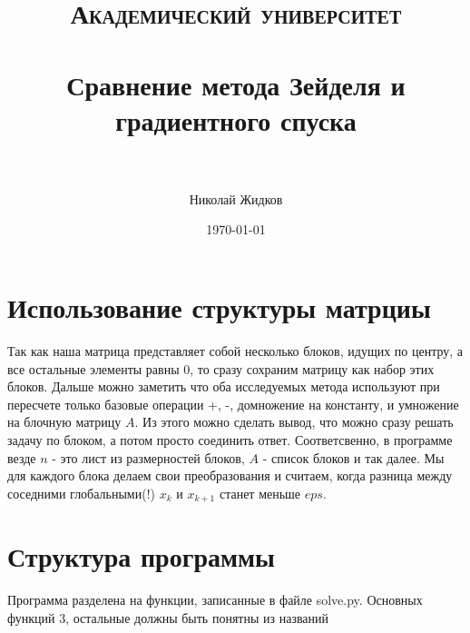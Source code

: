 \documentclass[paper=a4, fontsize=11pt]{scrartcl} %
\title{	
\normalfont \normalsize 
\textsc{Академический университет} \\ [25pt] %
\horrule{0.5pt} \\[0.4cm] %
\huge Сравнение метода Зейделя и градиентного спуска \\ %
\horrule{2pt} \\[0.5cm] %
}
\author{Николай Жидков} %
\date{\normalsize\today} %
\numberwithin{equation}{section} %
\numberwithin{figure}{section} %
\numberwithin{table}{section} %
\begin{document}
\maketitle %

\section{Использование структуры матрциы}

Так как наша матрица представляет собой несколько блоков, идущих по центру, а все остальные элементы равны 0, то сразу сохраним матрицу как набор этих блоков. Дальше можно заметить что оба исследуемых метода используют при пересчете только базовые операции +, -, домножение на константу, и умножение на блочную матрицу $A$. Из этого можно сделать вывод, что можно сразу решать задачу по блоком, а потом просто соединить ответ. Соответсвенно, в программе везде $n$ - это лист из размерностей блоков, $A$ - список блоков и так далее. Мы для каждого блока делаем свои преобразования и считаем, когда разница между соседними глобальными(!) $x_k$ и $x_{k+1}$ станет меньше $eps$.


\section{Структура программы}

Программа разделена на функции, записанные в файле solve.py. Основных функций 3, остальные должны быть понятны из названий
\end{document}

